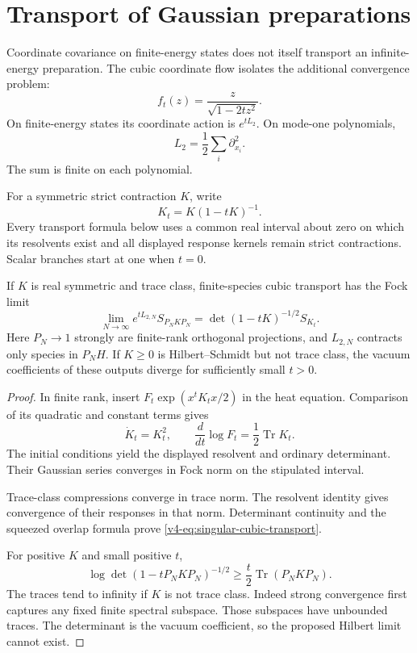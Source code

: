 \section{Transport of Gaussian preparations}
\label{v4-sec:singular-gaussian-transport}

Coordinate covariance on finite-energy states
does not itself transport an infinite-energy
preparation. The cubic coordinate flow isolates
the additional convergence problem:
\[
                  f_t(z)=\frac{z}{\sqrt{1-2tz^2}}.
\]
On finite-energy states its coordinate action
is \(e^{tL_2}\). On mode-one polynomials,
\[
                       L_2=\frac12\sum_i\partial_{x_i}^2.
\]
The sum is finite on each polynomial.

For a symmetric strict contraction \(K\), write
\[
                             K_t=K(1-tK)^{-1}.
\]
Every transport formula below uses a common
real interval about zero on which its resolvents
exist and all displayed response kernels remain
strict contractions. Scalar branches start
at one when \(t=0\).

\begin{theorem}\label{v4-thm:singular-cubic-transport}
If \(K\) is real symmetric and trace class,
finite-species cubic transport has the Fock limit
\begin{equation}\label{v4-eq:singular-cubic-transport}
 \lim_{N\to\infty}e^{tL_{2,N}}S_{P_NKP_N}
                  =\det(1-tK)^{-1/2}S_{K_t}.
\end{equation}
Here \(P_N\to1\) strongly are finite-rank
orthogonal projections, and \(L_{2,N}\)
contracts only species in \(P_NH\).
If \(K\geq0\) is Hilbert--Schmidt but not
trace class, the vacuum coefficients of
these outputs diverge for sufficiently small \(t>0\).
\end{theorem}

\begin{proof}
In finite rank, insert
\(F_t\exp(x^tK_tx/2)\) in the heat equation.
Comparison of its quadratic and constant
terms gives
\[
           \dot K_t=K_t^2,\qquad
           \frac{d}{dt}\log F_t=\frac12\operatorname{Tr}K_t.
\]
The initial conditions yield the displayed
resolvent and ordinary determinant.
Their Gaussian series converges in Fock norm
on the stipulated interval.

Trace-class compressions converge in trace norm.
The resolvent identity gives convergence of
their responses in that norm.
Determinant continuity and the squeezed
overlap formula prove \eqref{v4-eq:singular-cubic-transport}.

For positive \(K\) and small positive \(t\),
\[
 \log\det(1-tP_NKP_N)^{-1/2}
                  \geq\frac t2\operatorname{Tr}(P_NKP_N).
\]
The traces tend to infinity if \(K\) is
not trace class. Indeed strong convergence
first captures any fixed finite spectral
subspace. Those subspaces have unbounded traces.
The determinant is the vacuum coefficient,
so the proposed Hilbert limit cannot exist.
\end{proof}

